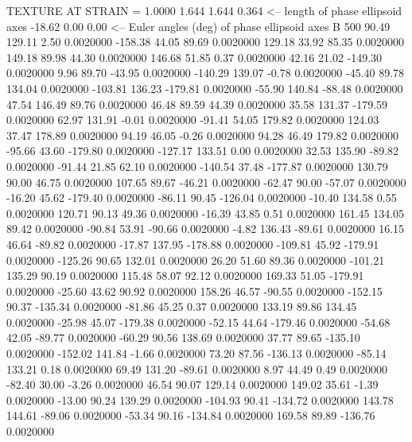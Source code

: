 TEXTURE AT STRAIN =    1.0000
   1.644   1.644   0.364  <-- length of phase ellipsoid axes
  -18.62    0.00    0.00  <-- Euler angles (deg) of phase ellipsoid axes
B       500
   90.49  129.11    2.50   0.0020000
 -158.38   44.05   89.69   0.0020000
  129.18   33.92   85.35   0.0020000
  149.18   89.98   44.30   0.0020000
  146.68   51.85    0.37   0.0020000
   42.16   21.02 -149.30   0.0020000
    9.96   89.70  -43.95   0.0020000
 -140.29  139.07   -0.78   0.0020000
  -45.40   89.78  134.04   0.0020000
 -103.81  136.23 -179.81   0.0020000
  -55.90  140.84  -88.48   0.0020000
   47.54  146.49   89.76   0.0020000
   46.48   89.59   44.39   0.0020000
   35.58  131.37 -179.59   0.0020000
   62.97  131.91   -0.01   0.0020000
  -91.41   54.05  179.82   0.0020000
  124.03   37.47  178.89   0.0020000
   94.19   46.05   -0.26   0.0020000
   94.28   46.49  179.82   0.0020000
  -95.66   43.60 -179.80   0.0020000
 -127.17  133.51    0.00   0.0020000
   32.53  135.90  -89.82   0.0020000
  -91.44   21.85   62.10   0.0020000
 -140.54   37.48 -177.87   0.0020000
  130.79   90.00   46.75   0.0020000
  107.65   89.67  -46.21   0.0020000
  -62.47   90.00  -57.07   0.0020000
  -16.20   45.62 -179.40   0.0020000
  -86.11   90.45 -126.04   0.0020000
  -10.40  134.58    0.55   0.0020000
  120.71   90.13   49.36   0.0020000
  -16.39   43.85    0.51   0.0020000
  161.45  134.05   89.42   0.0020000
  -90.84   53.91  -90.66   0.0020000
   -4.82  136.43  -89.61   0.0020000
   16.15   46.64  -89.82   0.0020000
  -17.87  137.95 -178.88   0.0020000
 -109.81   45.92 -179.91   0.0020000
 -125.26   90.65  132.01   0.0020000
   26.20   51.60   89.36   0.0020000
 -101.21  135.29   90.19   0.0020000
  115.48   58.07   92.12   0.0020000
  169.33   51.05 -179.91   0.0020000
  -25.60   43.62   90.92   0.0020000
  158.26   46.57  -90.55   0.0020000
 -152.15   90.37 -135.34   0.0020000
  -81.86   45.25    0.37   0.0020000
  133.19   89.86  134.45   0.0020000
  -25.98   45.07 -179.38   0.0020000
  -52.15   44.64 -179.46   0.0020000
  -54.68   42.05  -89.77   0.0020000
  -60.29   90.56  138.69   0.0020000
   37.77   89.65 -135.10   0.0020000
 -152.02  141.84   -1.66   0.0020000
   73.20   87.56 -136.13   0.0020000
  -85.14  133.21    0.18   0.0020000
   69.49  131.20  -89.61   0.0020000
    8.97   44.49    0.49   0.0020000
  -82.40   30.00   -3.26   0.0020000
   46.54   90.07  129.14   0.0020000
  149.02   35.61   -1.39   0.0020000
  -13.00   90.24  139.29   0.0020000
 -104.93   90.41 -134.72   0.0020000
  143.78  144.61  -89.06   0.0020000
  -53.34   90.16 -134.84   0.0020000
  169.58   89.89 -136.76   0.0020000
